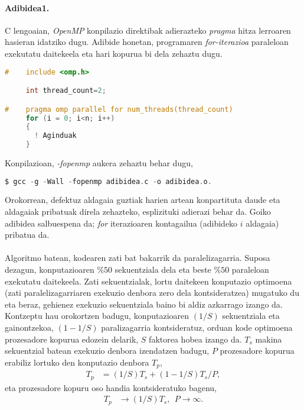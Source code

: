 \paragraph*{\textbf{Adibidea1.}} C lengoaian, \emph{OpenMP} konpilazio direktibak adierazteko \emph{pragma} hitza lerroaren hasieran idatziko dugu. Adibide honetan, programaren \emph{for-iterazioa} paraleloan exekutatu daitekeela  eta hari kopurua bi dela zehaztu dugu. 

\begin{lstlisting}[language=C]
#    include <omp.h>

     int thread_count=2;

#    pragma omp parallel for num_threads(thread_count) 
     for (i = 0; i<n; i++)
     {
       ! Aginduak 
     }
\end{lstlisting}

Konpilazioan, \emph{-fopenmp} aukera zehaztu behar dugu,
\begin{lstlisting}[language=C]
$ gcc -g -Wall -fopenmp adibidea.c -o adibidea.o.
\end{lstlisting}
Orokorrean, defektuz aldagaia guztiak harien artean konpartituta daude eta aldagaiak pribatuak direla zehazteko, esplizituki adierazi behar da. Goiko adibidea salbuespena da; \emph{for} iterazioaren kontagailua  (adibideko $i$ aldagaia) pribatua da.


\paragraph*{} Algoritmo batean, kodearen zati bat bakarrik  da paralelizagarria. Suposa dezagun, konputazioaren $\%50$ sekuentziala dela eta beste $\%50$ paraleloan exekutatu daitekeela. Zati sekuentzialak, lortu daitekeen konputazio optimoena (zati paralelizagarriaren exekuzio denbora zero dela kontsideratzea) mugatuko du eta beraz, gehienez exekuzio sekuentziala baino bi aldiz azkarrago izango da. 
Kontzeptu hau orokortzen badugu, konputazioaren $(1/S)$ sekuentziala eta gainontzekoa, $(1-1/S)$ paralizagarria kontsideratuz, orduan kode optimoena prozesadore kopurua edozein delarik, $S$ faktorea hobea izango da. $T_s$ makina sekuentzial batean exekuzio denbora izendatzen badugu, $P$ prozesadore kopurua erabiliz lortuko den konputazio denbora $T_p$,
\begin{align*}
T_p &=(1/S)T_s + (1-1/S)T_s/P,
\end{align*}
eta prozesadore kopuru oso handia kontsideratuko bagenu,
\begin{align*}
T_p &\rightarrow (1/S) T_s ,  \ \ P \rightarrow \infty.
\end{align*} 

